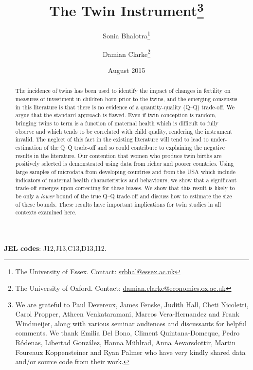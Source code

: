 \documentclass[subeqn]{article}
\title{The Twin Instrument\footnote{We are grateful to Paul Devereux, James 
Fenske, Judith Hall, Cheti Nicoletti, Carol Propper, Atheen Venkataramani, 
Marcos Vera-Hernandez and Frank Windmeijer, along with various seminar audiences 
and discussants for helpful comments.  We thank Emilia Del Bono, Climent 
Quintana-Domeque, Pedro R\'odenas, Libertad Gonz\'alez, Hanna M\"uhlrad, Anna 
Aevarsdottir, Martin Foureaux Koppensteiner and Ryan Palmer who have very 
kindly shared data and/or source code from their work.}}
\author{Sonia Bhalotra\thanks{The University of Essex.
Contact: \href{mailto:srbhal@essex.ac.uk}{srbhal@essex.ac.uk}} 
\and Damian Clarke\thanks{The University of Oxford. 
Contact: \href{mailto:damian.clarke@economics.ox.ac.uk}
{damian.clarke@economics.ox.ac.uk}}}
\date{August 2015}
\begin{document}
\begin{spacing}{1.4}

\maketitle
\vspace{-1cm}
\begin{abstract}
 The incidence of twins has been used to identify the impact of changes in 
 fertility on measures of investment in children born prior to the twins, and
 the emerging consensus in this literature is that there is no evidence of a
 quantity-quality (Q--Q) trade-off. We argue that the standard approach is 
 flawed. Even if twin conception is random, bringing twins to term is a function 
 of maternal health which is difficult to fully observe and which tends to be
 correlated with child quality, rendering the instrument invalid. The neglect
 of this fact in the existing literature will tend to lead to under-estimation 
 of the Q--Q trade-off and so could contribute to explaining the negative results
 in the literature. Our contention that women who produce twin births are
 positively selected is demonstrated using data from richer and poorer countries.
 Using large samples of microdata from developing countries and from the USA 
 which include indicators of maternal health characteristics and behaviours, we
 show that a significant trade-off emerges upon correcting for these biases. We
 show that this result is likely to be only a \emph{lower} bound of the true
 Q--Q trade-off and discuss how to estimate the size of these bounds. These
 results have important implications for twin studies in all contexts examined
 here.
\\
\end{abstract}
\hspace{4mm}\textbf{\small JEL codes}: J12,J13,C13,D13,I12. \\

\newpage

\end{spacing}
\end{document}
